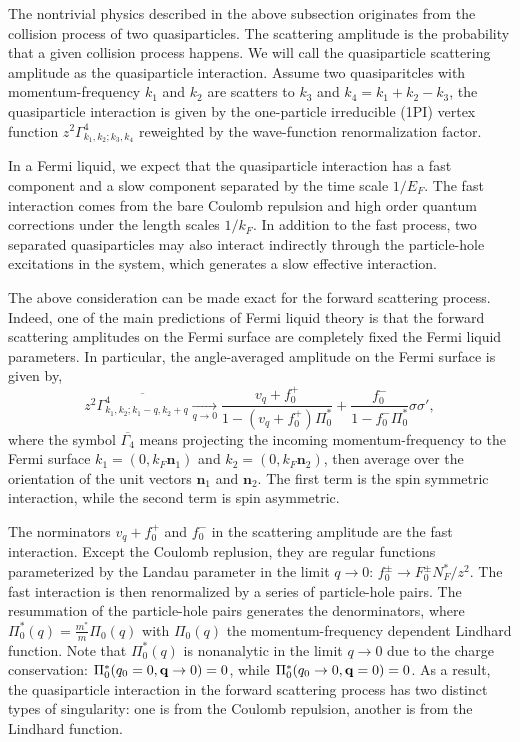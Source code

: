 \documentclass[reprint,amsmath,amssymb,aps,prb]{revtex4-1}
\begin{document}
The nontrivial physics described in the above subsection originates from the collision process of two quasiparticles. The scattering amplitude is the probability that a given collision process happens. We will call the quasiparticle scattering amplitude as the quasiparticle interaction. Assume two quasiparitcles with momentum-frequency $k_1$ and $k_2$ are scatters to $k_3$ and $k_4=k_1+k_2-k_3$, the quasiparticle interaction is given by the one-particle irreducible (1PI) vertex function $z^2 \Gamma^4_{k_1, k_2; k_3, k_4}$ reweighted by the wave-function renormalization factor.

In a Fermi liquid, we expect that the quasiparticle interaction has a fast component and a slow component separated by the time scale $1/E_F$. The fast interaction comes from the bare Coulomb repulsion and high order quantum corrections under the length scales $1/k_F$. In addition to the fast process, two separated quasiparticles may also interact indirectly through the particle-hole excitations in the system, which generates a slow effective interaction.

The above consideration can be made exact for the forward scattering process. Indeed, one of the main predictions of Fermi liquid theory is that the forward scattering amplitudes on the Fermi surface are completely fixed the Fermi liquid parameters. In particular, the angle-averaged amplitude on the Fermi surface is given by,
\begin{equation}
    \label{eq:gamma_FL}
    z^2\overline{\Gamma^4_{k_1, k_2; k_1-q, k_2+q}}
    \xrightarrow[q \rightarrow 0]{}\frac{v_q+f_0^+}{1-(v_q+f_0^+)\Pi^*_0}+\frac{f_0^-}{1-f_0^-\Pi_0^*}\sigma\sigma',
\end{equation}
where the symbol $\overline{\Gamma_4}$ means projecting the incoming momentum-frequency to the Fermi surface $k_1=(0, k_F\mathbf{n}_1)$ and $k_2=(0, k_F\mathbf{n}_2)$, then average over the orientation of the unit vectors $\mathbf{n}_1$ and $\mathbf{n}_2$. The first term is the spin symmetric interaction, while the second term is spin asymmetric.

The norminators $v_q+f_0^+$ and $f_0^-$ in the scattering amplitude are the fast interaction. Except the Coulomb replusion, they are regular functions parameterized by the Landau parameter in the limit $q\rightarrow 0$: $f_0^\pm \rightarrow F_0^\pm N_F^*/z^2$. The fast interaction is then renormalized by a series of particle-hole pairs. The resummation of the particle-hole pairs generates the denorminators, where $\Pi_0^*(q)=\frac{m^*}{m}\Pi_0(q)$ with $\Pi_0(q)$ the momentum-frequency dependent Lindhard function. Note that $\Pi_0^*(q)$ is nonanalytic in the limit $q\rightarrow 0$ due to the charge conservation: $\Pi_0^*(q_0=0, \mathbf{q} \rightarrow 0)=0$, while $\Pi_0^*(q_0\rightarrow 0, \mathbf{q} = 0)=0$. As a result, the quasiparticle interaction in the forward scattering process has two distinct types of singularity: one is from the Coulomb repulsion, another is from the Lindhard function.
\end{document}
